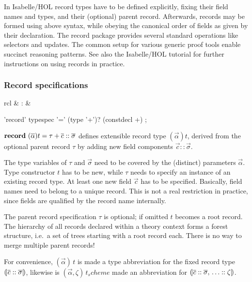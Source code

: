 \medskip

In Isabelle/HOL record types have to be defined explicitly, fixing their field
names and types, and their (optional) parent record.  Afterwards, records may
be formed using above syntax, while obeying the canonical order of fields as
given by their declaration.  The record package provides several standard
operations like selectors and updates.  The common setup for various generic
proof tools enable succinct reasoning patterns.  See also the Isabelle/HOL
tutorial \cite{isabelle-hol-book} for further instructions on using records in
practice.


\subsubsection{Record specifications}

\begin{matharray}{rcl}
   & : &  \\
\end{matharray}

\begin{rail}
  'record' typespec '=' (type '+')? (constdecl +)
  ;
\end{rail}

\begin{descr}
\item [${\mathord{\mathbf{record}}}~(\overline{\alpha})t = \tau + \overline{c} :: \overline{\sigma}$]
  defines extensible record type $(\vec\alpha)t$, derived from the optional
  parent record $\tau$ by adding new field components $\vec c :: \vec\sigma$.

  The type variables of $\tau$ and $\vec\sigma$ need to be covered by the
  (distinct) parameters $\vec\alpha$.  Type constructor $t$ has to be new,
  while $\tau$ needs to specify an instance of an existing record type.  At
  least one new field $\vec c$ has to be specified.  Basically, field names
  need to belong to a unique record.  This is not a real restriction in
  practice, since fields are qualified by the record name internally.

  The parent record specification $\tau$ is optional; if omitted $t$ becomes a
  root record.  The hierarchy of all records declared within a theory context
  forms a forest structure, i.e.\ a set of trees starting with a root record
  each.  There is no way to merge multiple parent records!

  For convenience, $(\vec\alpha) \, t$ is made a type abbreviation for the
  fixed record type $\mathopen{(\!|} \overline{c} \mathrel{::} \overline{\sigma} \mathclose{|\!)}$, likewise is
  $(\vec\alpha, \zeta) \, t_scheme$ made an abbreviation for $\mathopen{(\!|} \overline{c}
    \mathrel{::} \overline{\sigma}\mathpunct{,\,} \ldots \mathrel{::} \zeta \mathclose{|\!)}$.

\end{descr}

